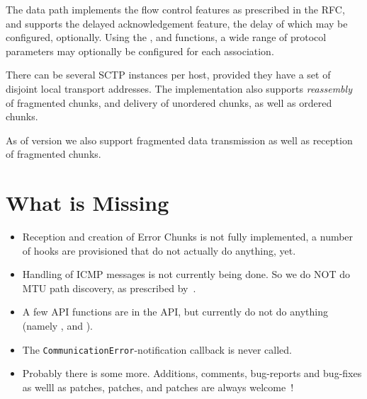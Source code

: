 \documentclass[10pt]{article}
\begin{document}
The data path implements the flow control features as prescribed in the RFC,
and supports the delayed acknowledgement feature, the delay of which may be configured,
optionally.
Using the ,  and
 functions, a wide range of protocol parameters
may optionally be configured for each association.

There can be several SCTP instances per host, provided they have a set of
disjoint local transport addresses.
The implementation also supports \emph{reassembly} of fragmented chunks, and
delivery of unordered chunks, as well as ordered chunks.

As of version  we also support fragmented data
transmission as well as reception of fragmented chunks.

\section{What is Missing}
\begin{itemize}
\item Reception and creation of Error Chunks is not fully implemented, a number 
of hooks are provisioned that do not actually do anything, yet.
\item Handling of ICMP messages is not currently being done. So we do NOT do MTU
path discovery, as prescribed by~\cite{RFC4960}.
\item A few API functions are in the API, but currently do not do anything
(namely  ,  and
).
\item The \texttt{CommunicationError}-notification callback is never
called.
\item Probably there is some more. Additions, comments, bug-reports and
bug-fixes as welll as patches, patches, and patches are always welcome~!
\end{itemize}
\end{document}
